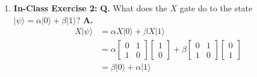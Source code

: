 \documentclass[main.tex]{subfiles}
\begin{document}
\begin{enumerate}
\item[] \textbf{In-Class Exercise 2:} \textbf{Q.} What does the $X$ gate do to the state $|\psi\rangle=\alpha|0\rangle+\beta|1\rangle$? \textbf{A.} 
\begin{align*}
    X |\psi\rangle  & = \alpha X |0\rangle + \beta X|1\rangle\\
                    & =  \alpha \left[\begin{array}{ll} 0 & 1 \\ 1 & 0 \end{array}\right] \left[\begin{array}{l} 1 \\ 0 \end{array} \right]
                    + \beta \left[\begin{array}{ll} 0 & 1 \\ 1 & 0 \end{array}\right] \left[\begin{array}{l} 0 \\ 1 \end{array} \right]\\
                    & = \beta |0\rangle + \alpha |1\rangle\\
\end{align*}


\end{enumerate}
\end{document}
